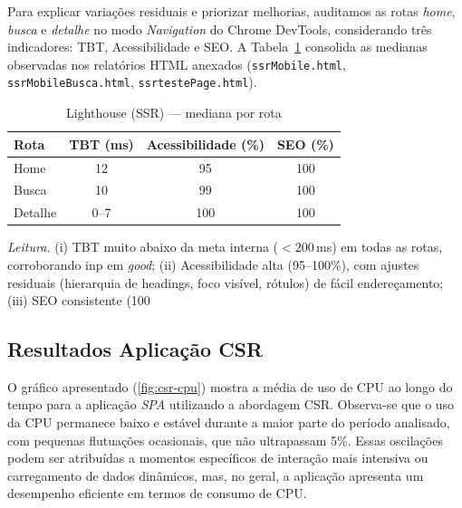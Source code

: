{Para explicar variações residuais e priorizar melhorias, auditamos as rotas \emph{home}, \emph{busca} e \emph{detalhe} no modo \emph{Navigation} do Chrome DevTools, considerando três indicadores: TBT, Acessibilidade e SEO. A Tabela~\ref{tab:lh-ssr} consolida as medianas observadas nos relatórios HTML anexados (\texttt{ssrMobile.html}, \texttt{ssrMobileBusca.html}, \texttt{ssrtestePage.html}).

\begin{table}[H]
\centering
\caption{Lighthouse (SSR) — mediana por rota}
\label{tab:lh-ssr}
\begin{tabular}{|l|c|c|c|}
\hline
Rota & TBT (ms) & Acessibilidade (\%) & SEO (\%) \\
\hline
Home    & 12 & 95  & 100 \\
Busca   & 10 & 99  & 100 \\
Detalhe & 0--7\footnotemark[1] & 100 & 100 \\
\hline
\end{tabular}
\end{table}

\noindent \textit{Leitura.}
(i) TBT muito abaixo da meta interna ($<200$\,ms) em todas as rotas, corroborando \acrshort{inp} em \textit{good};
(ii) Acessibilidade alta (95--100\%), com ajustes residuais (hierarquia de headings, foco visível, rótulos) de fácil endereçamento;
(iii) SEO consistente (100%

\subsection{Resultados Aplicação CSR}
\label{subsec:resultados-csr}

O gráfico apresentado (\autoref{fig:csr-cpu}) mostra a média de uso de CPU ao longo do tempo para a aplicação \emph{SPA} utilizando a abordagem CSR. Observa-se que o uso da CPU permanece baixo e estável durante a maior parte do período analisado, com pequenas flutuações ocasionais, que não ultrapassam 5\%. Essas oscilações podem ser atribuídas a momentos específicos de interação mais intensiva ou carregamento de dados dinâmicos, mas, no geral, a aplicação apresenta um desempenho eficiente em termos de consumo de CPU.

}
